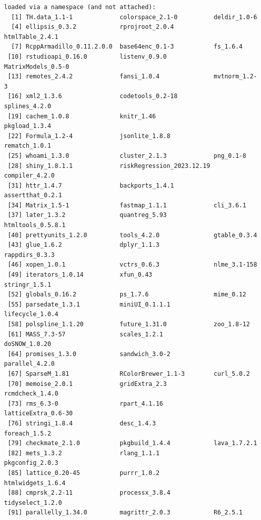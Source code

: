 \documentclass[12pt]{article}
\begin{document}
\begin{verbatim}
loaded via a namespace (and not attached):
  [1] TH.data_1.1-1             colorspace_2.1-0          deldir_1.0-6             
  [4] ellipsis_0.3.2            rprojroot_2.0.4           htmlTable_2.4.1          
  [7] RcppArmadillo_0.11.2.0.0  base64enc_0.1-3           fs_1.6.4                 
 [10] rstudioapi_0.16.0         listenv_0.9.0             MatrixModels_0.5-0       
 [13] remotes_2.4.2             fansi_1.0.4               mvtnorm_1.2-3            
 [16] xml2_1.3.6                codetools_0.2-18          splines_4.2.0            
 [19] cachem_1.0.8              knitr_1.46                pkgload_1.3.4            
 [22] Formula_1.2-4             jsonlite_1.8.8            rematch_1.0.1            
 [25] whoami_1.3.0              cluster_2.1.3             png_0.1-8                
 [28] shiny_1.8.1.1             riskRegression_2023.12.19 compiler_4.2.0           
 [31] httr_1.4.7                backports_1.4.1           assertthat_0.2.1         
 [34] Matrix_1.5-1              fastmap_1.1.1             cli_3.6.1                
 [37] later_1.3.2               quantreg_5.93             htmltools_0.5.8.1        
 [40] prettyunits_1.2.0         tools_4.2.0               gtable_0.3.4             
 [43] glue_1.6.2                dplyr_1.1.3               rappdirs_0.3.3           
 [46] xopen_1.0.1               vctrs_0.6.3               nlme_3.1-158             
 [49] iterators_1.0.14          xfun_0.43                 stringr_1.5.1            
 [52] globals_0.16.2            ps_1.7.6                  mime_0.12                
 [55] parsedate_1.3.1           miniUI_0.1.1.1            lifecycle_1.0.4          
 [58] polspline_1.1.20          future_1.31.0             zoo_1.8-12               
 [61] MASS_7.3-57               scales_1.2.1              doSNOW_1.0.20            
 [64] promises_1.3.0            sandwich_3.0-2            parallel_4.2.0           
 [67] SparseM_1.81              RColorBrewer_1.1-3        curl_5.0.2               
 [70] memoise_2.0.1             gridExtra_2.3             rcmdcheck_1.4.0          
 [73] rms_6.3-0                 rpart_4.1.16              latticeExtra_0.6-30      
 [76] stringi_1.8.4             desc_1.4.3                foreach_1.5.2            
 [79] checkmate_2.1.0           pkgbuild_1.4.4            lava_1.7.2.1             
 [82] mets_1.3.2                rlang_1.1.1               pkgconfig_2.0.3          
 [85] lattice_0.20-45           purrr_1.0.2               htmlwidgets_1.6.4        
 [88] cmprsk_2.2-11             processx_3.8.4            tidyselect_1.2.0         
 [91] parallelly_1.34.0         magrittr_2.0.3            R6_2.5.1                 

\end{verbatim}
\end{document}
